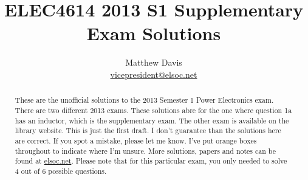 \documentclass[a4paper]{article}
\title{ELEC4614 2013 S1 Supplementary Exam Solutions}
\author{Matthew Davis \\ \href{mailto:vicepresident@elsoc.net}{vicepresident@elsoc.net}}
\renewcommand\thesubsection{(\alph{subsection})}
\begin{document}
\maketitle

\begin{abstract}
    These are the unofficial solutions to the 2013 Semester 1 Power Electronics exam.
    There are two different 2013 exams. 
    These solutions abre for the one where question 1a has an inductor, which is the supplementary exam.
    The other exam is available on the library website.
    This is just the first draft. I don't guarantee than the solutions here are correct. If you spot a mistake, please let me know. I've put orange boxes throughout to indicate where I'm unsure.
    More solutions, papers and notes can be found at \href{www.elsoc.net}{elsoc.net}.
    Please note that for this particular exam, you only needed to solve 4 out of 6 possible questions.
\end{abstract}


\tableofcontents





\renewcommand\thesubsection{(\roman{subsection})}

\renewcommand\thesubsection{(\alph{subsection})}


\end{document}
